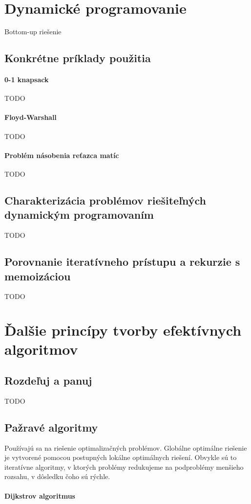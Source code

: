 \section{Dynamické programovanie}
	Bottom-up riešenie
	\subsection{Konkrétne príklady použitia} 
		\paragraph{0-1 knapsack} TODO
		\paragraph{Floyd-Warshall} TODO
		\paragraph{Problém násobenia reťazca matíc} TODO

	\subsection{Charakterizácia problémov riešiteľných dynamickým programovaním} TODO
	
	\subsection{Porovnanie iteratívneho prístupu a rekurzie s memoizáciou} TODO


\section{Ďalšie princípy tvorby efektívnych algoritmov}
	\subsection{Rozdeľuj a panuj}
	TODO
	\subsection{Pažravé algoritmy}
		Používajú sa na riešenie optimalizačných problémov. Globálne optimálne riešenie je vytvorené pomocou postupných lokálne optimálnych riešení. Obvykle sú to iteratívne algoritmy, v ktorých problémy redukujeme na podproblémy menšieho rozsahu, v dôsledku čoho sú rýchle.
		\paragraph{Dijkstrov algoritmus}
